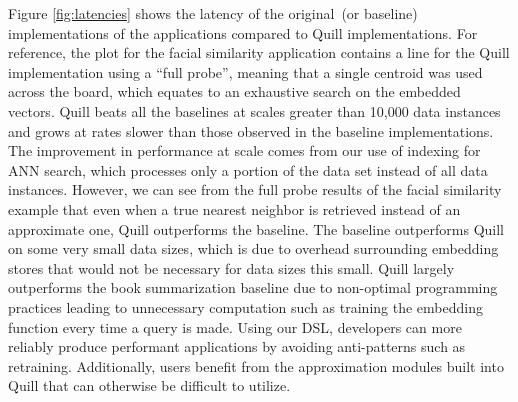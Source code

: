 \documentclass[11pt]{article}
\begin{document}
Figure \ref{fig:latencies} shows the latency of the original~(or baseline) implementations of the applications compared to Quill implementations.
For reference, the plot for the facial similarity application contains a line for the Quill implementation using a ``full probe'', meaning that a single centroid was used across the board, which equates to an exhaustive search on the embedded vectors.
Quill beats all the baselines at scales greater than 10,000 data instances and grows at rates slower than those observed in the baseline implementations.
The improvement in performance at scale comes from our use of indexing for ANN search, which processes only a portion of the data set instead of all data instances.
However, we can see from the full probe results of the facial similarity example that even when a true nearest neighbor is retrieved instead of an approximate one, Quill outperforms the baseline.
The baseline outperforms Quill on some very small data sizes, which is due to overhead surrounding embedding stores that would not be necessary for data sizes this small.
Quill largely outperforms the book summarization baseline due to non-optimal programming practices leading to unnecessary computation such as training the embedding function every time a query is made.
Using our DSL, developers can more reliably produce performant applications by avoiding anti-patterns such as retraining.
Additionally, users benefit from the approximation modules built into Quill that can otherwise be difficult to utilize.
\vspace{0.1cm}
\end{document}
